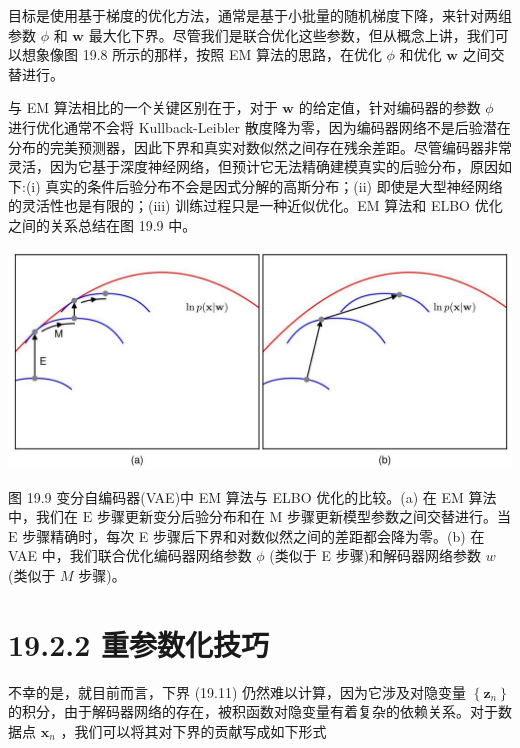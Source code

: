 \documentclass[10pt]{article}
\begin{document}
目标是使用基于梯度的优化方法，通常是基于小批量的随机梯度下降，来针对两组参数 \(\phi\) 和 \(\mathbf{w}\) 最大化下界。尽管我们是联合优化这些参数，但从概念上讲，我们可以想象像图 19.8 所示的那样，按照 EM 算法的思路，在优化 \(\phi\) 和优化 \(\mathbf{w}\) 之间交替进行。

与 EM 算法相比的一个关键区别在于，对于 \(\mathbf{w}\) 的给定值，针对编码器的参数 \(\phi\) 进行优化通常不会将 Kullback-Leibler 散度降为零，因为编码器网络不是后验潜在分布的完美预测器，因此下界和真实对数似然之间存在残余差距。尽管编码器非常灵活，因为它基于深度神经网络，但预计它无法精确建模真实的后验分布，原因如下:(i) 真实的条件后验分布不会是因式分解的高斯分布；(ii) 即使是大型神经网络的灵活性也是有限的；(iii) 训练过程只是一种近似优化。EM 算法和 ELBO 优化之间的关系总结在图 19.9 中。

\begin{center}
\includegraphics[max width=1.0\textwidth]{images/0194e279-9b28-703a-88f4-c3ac21e2010d_593_237_347_1331_581_0.jpg}
\end{center}
\hspace*{3em} 

图 19.9 变分自编码器(VAE)中 EM 算法与 ELBO 优化的比较。(a) 在 EM 算法中，我们在 \(\mathrm{E}\) 步骤更新变分后验分布和在 \(\mathrm{M}\) 步骤更新模型参数之间交替进行。当 \(\mathrm{E}\) 步骤精确时，每次 E 步骤后下界和对数似然之间的差距都会降为零。(b) 在 VAE 中，我们联合优化编码器网络参数 \(\phi\) (类似于 E 步骤)和解码器网络参数 \(w\) (类似于 \(M\) 步骤)。

\section*{19.2.2 重参数化技巧}

不幸的是，就目前而言，下界 (19.11) 仍然难以计算，因为它涉及对隐变量 \(\left\{  {\mathbf{z}}_{n}\right\}\) 的积分，由于解码器网络的存在，被积函数对隐变量有着复杂的依赖关系。对于数据点 \({\mathbf{x}}_{n}\) ，我们可以将其对下界的贡献写成如下形式
\end{document}
